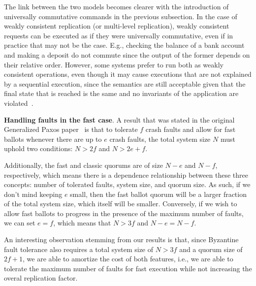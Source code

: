 The link between the two models becomes clearer with the introduction of 
universally commutative commands in the previous subsection.
In the case of weakly consistent replication (or multi-level replication),
weakly consistent requests can be executed as if they were universally
commutative, even if in practice that may not be the case. E.g., checking 
the balance of a bank account and making a deposit do not commute since
the output of the former depends on their relative order. However,
some systems prefer to run both as weakly consistent operations, even
though it may cause executions that are not explained by a sequential
execution, since the semantics are still acceptable given
that the final state that is reached is the same and no invariants 
of the application are violated~\cite{Li2012}.

\noindent \textbf{Handling faults in the fast case}.
A result that was stated in the original Generalized Paxos
paper~\cite{Lamport2005} is that to tolerate $f$ crash faults and
allow for fast ballots whenever there are up to $e$ crash faults, the
total system size $N$ must uphold two conditions:
$N > 2f$ and $N > 2e+f$.

Additionally, the fast and classic quorums are of size $N-e$ and $N-f$, respectively, which means there is a dependence relationship between these three concepts: number of tolerated faults, system size, and quorum size. As such, if we don't mind keeping $e$ small, then the fast ballot quorum will be a larger fraction of the total system size, which itself will be smaller. Conversely, if we wish to allow fast ballots to progress in the presence of the maximum number of faults, we can set $e=f$, which means that $N >3f$ and $N-e=N-f$. 


An interesting observation stemming from our results is that, since Byzantine fault tolerance also requires a total system size of $N>3f$ and a quorum size of $2f+1$, we are able to amortize the cost of both features, i.e., we are able to tolerate the maximum number of faults for fast execution while not increasing the overal replication factor.

